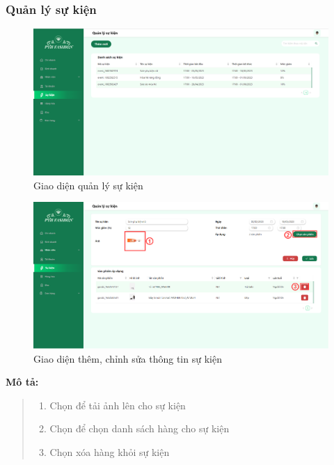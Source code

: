 \subsubsection{Quản lý sự kiện}
\begin{figure}[!htp]
    \centering
    \includegraphics[width=12cm]{img/UI/admin_implement/event.png}
    \newline
    \caption{Giao diện quản lý sự kiện}
\end{figure}


\newpage

\begin{figure}[!htp]
    \centering
    \includegraphics[width=12cm]{img/UI/admin_implement/eventEdit.png}
    \newline
    \caption{Giao diện thêm, chỉnh sửa thông tin sự kiện}
\end{figure}
\textbf{Mô tả:}
\begin{quote}
    \begin{enumerate}
        \item Chọn để tải ảnh lên cho sự kiện
        \item Chọn để chọn danh sách hàng cho sự kiện
        \item Chọn xóa hàng khỏi sự kiện
    \end{enumerate}
\end{quote}

